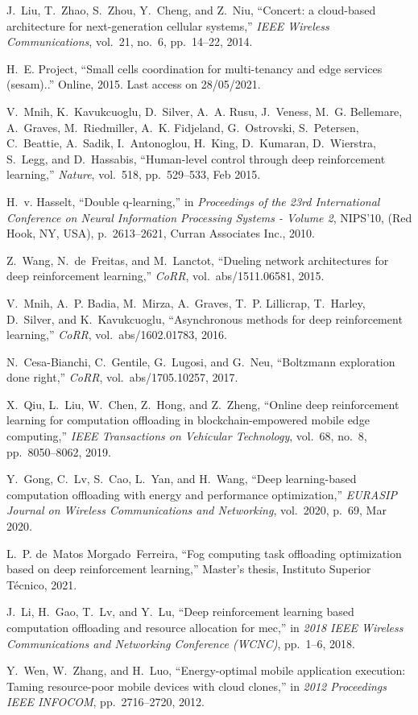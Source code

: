 \documentclass[conference]{IEEEtran}
\begin{document}
\begin{thebibliography}{1}
J.~Liu, T.~Zhao, S.~Zhou, Y.~Cheng, and Z.~Niu, ``Concert: a cloud-based
  architecture for next-generation cellular systems,'' {\em IEEE Wireless
  Communications}, vol.~21, no.~6, pp.~14--22, 2014.

H.~E. Project, ``Small cells coordination for multi-tenancy and edge services
  (sesam)..'' Online, 2015.
\newblock Last access on 28/05/2021.

V.~Mnih, K.~Kavukcuoglu, D.~Silver, A.~A. Rusu, J.~Veness, M.~G. Bellemare,
  A.~Graves, M.~Riedmiller, A.~K. Fidjeland, G.~Ostrovski, S.~Petersen,
  C.~Beattie, A.~Sadik, I.~Antonoglou, H.~King, D.~Kumaran, D.~Wierstra,
  S.~Legg, and D.~Hassabis, ``Human-level control through deep reinforcement
  learning,'' {\em Nature}, vol.~518, pp.~529--533, Feb 2015.

H.~v. Hasselt, ``Double q-learning,'' in {\em Proceedings of the 23rd
  International Conference on Neural Information Processing Systems - Volume
  2}, NIPS'10, (Red Hook, NY, USA), p.~2613–2621, Curran Associates Inc.,
  2010.

Z.~Wang, N.~de~Freitas, and M.~Lanctot, ``Dueling network architectures for
  deep reinforcement learning,'' {\em CoRR}, vol.~abs/1511.06581, 2015.

V.~Mnih, A.~P. Badia, M.~Mirza, A.~Graves, T.~P. Lillicrap, T.~Harley,
  D.~Silver, and K.~Kavukcuoglu, ``Asynchronous methods for deep reinforcement
  learning,'' {\em CoRR}, vol.~abs/1602.01783, 2016.

N.~Cesa{-}Bianchi, C.~Gentile, G.~Lugosi, and G.~Neu, ``Boltzmann exploration
  done right,'' {\em CoRR}, vol.~abs/1705.10257, 2017.

X.~Qiu, L.~Liu, W.~Chen, Z.~Hong, and Z.~Zheng, ``Online deep reinforcement
  learning for computation offloading in blockchain-empowered mobile edge
  computing,'' {\em IEEE Transactions on Vehicular Technology}, vol.~68, no.~8,
  pp.~8050--8062, 2019.

Y.~Gong, C.~Lv, S.~Cao, L.~Yan, and H.~Wang, ``Deep learning-based computation
  offloading with energy and performance optimization,'' {\em EURASIP Journal
  on Wireless Communications and Networking}, vol.~2020, p.~69, Mar 2020.

L.~P. de~Matos Morgado~Ferreira, ``Fog computing task offloading optimization
  based on deep reinforcement learning,'' Master's thesis, Instituto Superior
  Técnico, 2021.

J.~Li, H.~Gao, T.~Lv, and Y.~Lu, ``Deep reinforcement learning based
  computation offloading and resource allocation for mec,'' in {\em 2018 IEEE
  Wireless Communications and Networking Conference (WCNC)}, pp.~1--6, 2018.

Y.~Wen, W.~Zhang, and H.~Luo, ``Energy-optimal mobile application execution:
  Taming resource-poor mobile devices with cloud clones,'' in {\em 2012
  Proceedings IEEE INFOCOM}, pp.~2716--2720, 2012.

\end{thebibliography}
\end{document}

